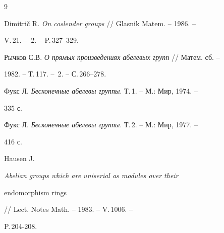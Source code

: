 \begin{thebibliography}{9} 


 




Dimitri\v c R. {\em On coslender groups} // Glasnik Matem. -- 1986. -- 


V.\,21. -- \No\,2. -- P.\,327--329. 




Рычков С.В. {\em О прямых произведениях абелевых групп} // Матем. сб. -- 


1982. -- Т.\,117. -- \No\,2. -- С.\,266--278. 




Фукс Л. {\em Бесконечные абелевы группы}. Т.\,1. -- М.: Мир, 1974. -- 


335 с. 




Фукс Л. {\em Бесконечные абелевы группы}. Т.\,2. -- М.: Мир, 1977. -- 


416 с. 




Hausen J. {\em Abelian groups which are uniserial as modules over their 


endomorphism rings} // Lect. Notes Math. -- 1983. -- V.\,1006. -- 


P.\,204-208. 


 


\end{thebibliography} 


 


\vskip 2cm 


 








 


\label{end} 


 


